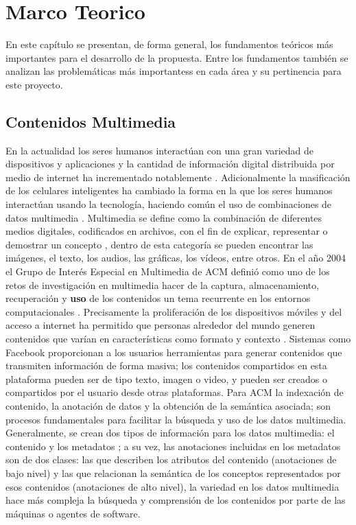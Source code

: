 \chapter{Marco Teorico}
\label{chp:Marco_Teorico}

En este capítulo se presentan, de forma general, los fundamentos teóricos más importantes para el desarrollo de la propuesta. Entre los fundamentos también se
analizan las problemáticas más importantess en cada área y su pertinencia para este proyecto.

\section{Contenidos Multimedia}
\label{sec:MT_ContenidosMultimedia}

En la actualidad los seres humanos interactúan con una gran variedad de dispositivos y aplicaciones y la cantidad de información digital distribuida por medio de internet ha incrementado notablemente \cite{stamou2006multimedia}. Adicionalmente la masificación de los celulares inteligentes ha cambiado la forma en la que los seres humanos interactúan usando la tecnología, haciendo común el uso de combinaciones de datos multimedia \cite{bracamonte2017extracting}. Multimedia se define como la combinación de diferentes medios digitales, codificados en archivos, con el fin de explicar, representar o demostrar un concepto \cite{rowe2005acm}, dentro de esta categoría se pueden encontrar las imágenes, el texto, los audios, las gráficas, los vídeos, entre otros.
En el año 2004 el Grupo de Interés Especial en Multimedia de ACM definió como uno de los retos de investigación en multimedia hacer de la captura, almacenamiento, recuperación y \textbf{uso} de los contenidos un tema recurrente en los entornos computacionales \cite{rowe2005acm}. Precisamente la proliferación de los dispositivos móviles y del acceso a internet ha permitido que personas alrededor del mundo generen contenidos que varían en características como formato y contexto \cite{bracamonte2017extracting}. Sistemas como Facebook proporcionan a los usuarios herramientas para generar contenidos que transmiten información de forma masiva; los contenidos compartidos en esta plataforma pueden ser de tipo texto, imagen o video, y pueden ser creados o compartidos por el usuario desde otras plataformas.
Para ACM \cite{rowe2005acm} la indexación de contenido, la anotación de datos y la obtención de la semántica asociada; son procesos fundamentales para facilitar la búsqueda y uso de los datos multimedia. Generalmente, se crean dos tipos de información para los datos multimedia: el contenido y los metadatos \cite{bracamonte2017extracting}; a su vez, las anotaciones incluidas en los metadatos son de dos clases: las que describen los atributos del contenido (anotaciones de bajo nivel) y las que relacionan la semántica de los conceptos representados por esos contenidos (anotaciones de alto nivel), la variedad en los datos multimedia hace más compleja la búsqueda y comprensión de los contenidos por parte de las máquinas o agentes de software.

